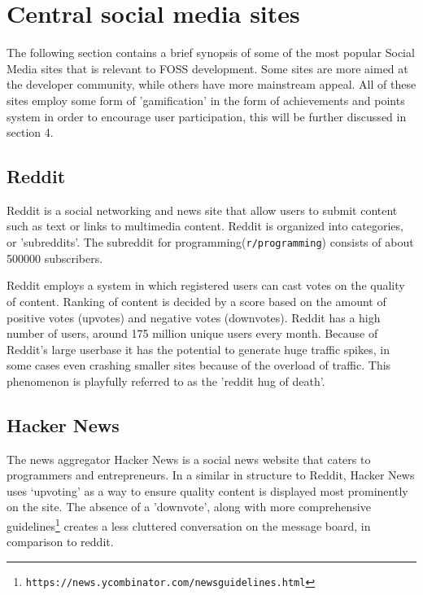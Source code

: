 \documentclass[a4paper,11pt]{article} %
\begin{document}
\section{Central social media sites}

The following section contains a brief synopsis of some of the most popular
Social Media sites that is relevant to FOSS development. Some sites are more
aimed at the developer community, while others have more mainstream appeal.
All of these sites employ some form of 'gamification' in the form of achievements
and points system in order to encourage user participation, this will be further
discussed in section 4. 

\subsection{Reddit}

Reddit is a social networking and news site that allow users to submit
content such as text or links to multimedia content. Reddit is organized
into categories, or 'subreddits'. The subreddit for
programming(\texttt{r/programming}) consists of about \num{500000}
subscribers.

Reddit employs a system in which registered users can cast votes on the
quality of content. Ranking of content is decided by a score based on the
amount of positive votes (upvotes) and negative votes (downvotes). Reddit has
a high number of users, around 175 million unique users every month. Because
of Reddit's large userbase it has the potential to generate huge traffic
spikes, in some cases even crashing smaller sites because of the overload of
traffic. This phenomenon is playfully referred to as the 'reddit hug of
death’.


\subsection{Hacker News}
The news aggregator Hacker News is a social news website that caters to
programmers and entrepreneurs. In a similar in structure to Reddit, Hacker
News uses ‘upvoting’ as a way to ensure quality content is displayed most
prominently on the site. The absence of a 'downvote', along with more
comprehensive
guidelines\footnote{\texttt{https://news.ycombinator.com/newsguidelines.html}} 
creates a less cluttered conversation on the message board, in comparison
to reddit.
\end{document}
